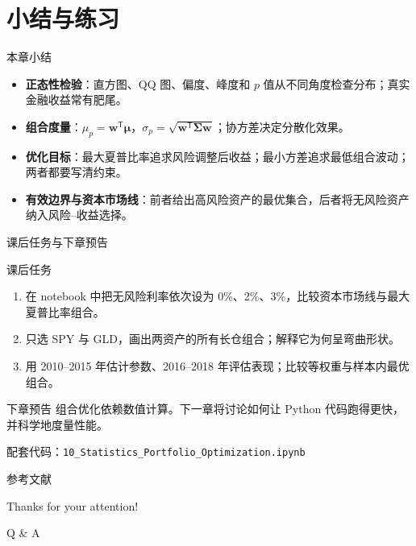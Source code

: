 \documentclass[9pt]{ctexbeamer}
\begin{document}
\section{小结与练习}

\begin{frame}{本章小结}
  \begin{itemize}
    \item \textbf{正态性检验}：直方图、QQ 图、偏度、峰度和 $p$ 值从不同角度检查分布；真实金融收益常有肥尾。
    \item \textbf{组合度量}：$\mu_p=\bm{w}^\mathsf{T}\bm{\mu}$，$\sigma_p=\sqrt{\bm{w}^\mathsf{T}\bm{\Sigma}\bm{w}}$；协方差决定分散化效果。
    \item \textbf{优化目标}：最大夏普比率追求风险调整后收益；最小方差追求最低组合波动；两者都要写清约束。
    \item \textbf{有效边界与资本市场线}：前者给出高风险资产的最优集合，后者将无风险资产纳入风险--收益选择。
  \end{itemize}
\end{frame}

\begin{frame}{课后任务与下章预告}
  \begin{block}{课后任务}
    \begin{enumerate}
      \item 在 notebook 中把无风险利率依次设为 0\%、2\%、3\%，比较资本市场线与最大夏普比率组合。
      \item 只选 SPY 与 GLD，画出两资产的所有长仓组合；解释它为何呈弯曲形状。
      \item 用 2010--2015 年估计参数、2016--2018 年评估表现；比较等权重与样本内最优组合。
    \end{enumerate}
  \end{block}
  \begin{exampleblock}{下章预告}
    组合优化依赖数值计算。下一章将讨论如何让 Python 代码跑得更快，并科学地度量性能。
  \end{exampleblock}
  \begin{center}
    配套代码：\texttt{10\_Statistics\_Portfolio\_Optimization.ipynb}
  \end{center}
\end{frame}

\appendix

\begin{frame}[allowframebreaks]{参考文献}
  
  
\end{frame}

\begin{frame}
  \begin{center}
    {\Huge\calligra Thanks for your attention!}
    \vspace{1cm}

    {\Huge Q \& A}
  \end{center}
\end{frame}
\end{document}
